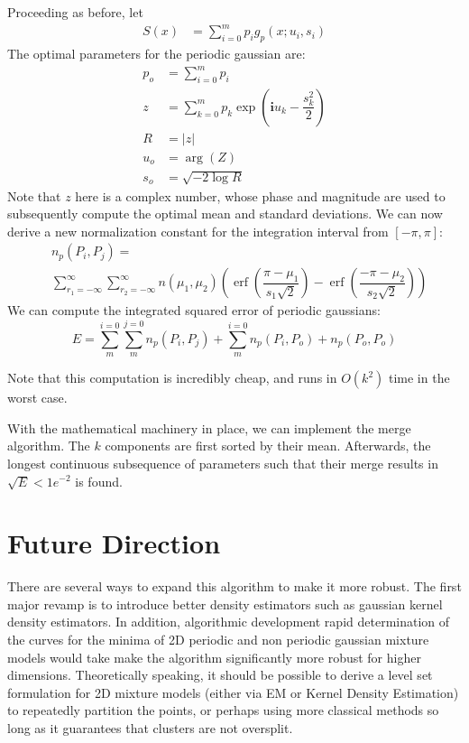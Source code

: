 \documentclass{acm_proc_article-sp}
\DeclareMathOperator\erf{erf}
\begin{document}
Proceeding as before, let
 \begin{align}
S(x) &= \sum\limits^{m}_{i=0} p_i g_p(x; u_i, s_i)
\end{align}
The optimal parameters for the periodic gaussian are:
\begin{align*}
p_o &= \sum \limits^{m}_{i=0} p_i \\
z &= \sum\limits^{m}_{k=0} p_k \exp\left(\boldsymbol{i}u_k-\dfrac{s_k^2}{2}\right) \\
R &= |z| \\
u_o &= \arg(Z) \\
s_o &= \sqrt{-2\log R}
\end{align*}
Note that $z$ here is a complex number, whose phase and magnitude are used to subsequently compute the optimal mean and standard deviations. We can now derive a new normalization constant for the integration interval from $[-\pi, \pi]$:
\begin{align*}
&n_p(P_i,P_j) = \\
&\sum \limits^{\infty}_{r_1=-\infty} \sum \limits^{\infty}_{r_2=-\infty} n(\mu_1, \mu_2) \left(\erf\left( \dfrac{\pi-\mu_1}{s_1\sqrt{2}}\right) - \erf\left( \dfrac{-\pi-\mu_2}{s_2\sqrt{2}}\right)\right)
\end{align*}
We can compute the integrated squared error of periodic gaussians:
\begin{equation}
E = \sum \limits^{i=0}_{m} \sum \limits^{j=0}_{m} n_p(P_i, P_j) + \sum \limits^{i=0}_{m} n_p(P_i, P_o) +n_p(P_o, P_o)
\end{equation}

Note that this computation is incredibly cheap, and runs in $O(k^2)$ time in the worst case. 

With the mathematical machinery in place, we can implement the merge algorithm. The $k$ components are first sorted by their mean. Afterwards, the longest continuous subsequence of parameters such that their merge results in $\sqrt{E} < 1e^{-2}$ is found.

\section{Future Direction}

There are several ways to expand this algorithm to make it more robust. The first major revamp is to introduce better density estimators such as gaussian kernel density estimators. In addition, algorithmic development rapid determination of the curves for the minima of 2D periodic and non periodic gaussian mixture models would take make the algorithm significantly more robust for higher dimensions. Theoretically speaking, it should be possible to derive a level set formulation for 2D mixture models (either via EM or Kernel Density Estimation) to repeatedly partition the points, or perhaps using more classical methods so long as it guarantees that clusters are not oversplit. 
\end{document}
